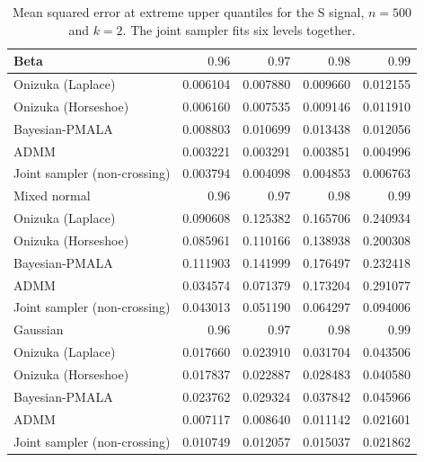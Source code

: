 \begin{table}[!htbp]
\centering
\small
\caption{Mean squared error at extreme upper quantiles for the S signal, $n=500$ and $k=2$. The joint sampler fits six levels together.}
\label{tab:s_ext_upper_mse}
\begin{tabular}{lrrrr}
\toprule
Beta & $0.96$ & $0.97$ & $0.98$ & $0.99$ \\
\midrule
Onizuka (Laplace) & 0.006104 & 0.007880 & 0.009660 & 0.012155 \\
Onizuka (Horseshoe) & 0.006160 & 0.007535 & 0.009146 & 0.011910 \\
Bayesian-PMALA & 0.008803 & 0.010699 & 0.013438 & 0.012056 \\
ADMM & 0.003221 & 0.003291 & 0.003851 & 0.004996 \\
Joint sampler (non-crossing) & 0.003794 & 0.004098 & 0.004853 & 0.006763 \\
\midrule
Mixed normal & $0.96$ & $0.97$ & $0.98$ & $0.99$ \\
\midrule
Onizuka (Laplace) & 0.090608 & 0.125382 & 0.165706 & 0.240934 \\
Onizuka (Horseshoe) & 0.085961 & 0.110166 & 0.138938 & 0.200308 \\
Bayesian-PMALA & 0.111903 & 0.141999 & 0.176497 & 0.232418 \\
ADMM & 0.034574 & 0.071379 & 0.173204 & 0.291077 \\
Joint sampler (non-crossing) & 0.043013 & 0.051190 & 0.064297 & 0.094006 \\
\midrule
Gaussian & $0.96$ & $0.97$ & $0.98$ & $0.99$ \\
\midrule
Onizuka (Laplace) & 0.017660 & 0.023910 & 0.031704 & 0.043506 \\
Onizuka (Horseshoe) & 0.017837 & 0.022887 & 0.028483 & 0.040580 \\
Bayesian-PMALA & 0.023762 & 0.029324 & 0.037842 & 0.045966 \\
ADMM & 0.007117 & 0.008640 & 0.011142 & 0.021601 \\
Joint sampler (non-crossing) & 0.010749 & 0.012057 & 0.015037 & 0.021862 \\
\bottomrule
\end{tabular}
\end{table}
